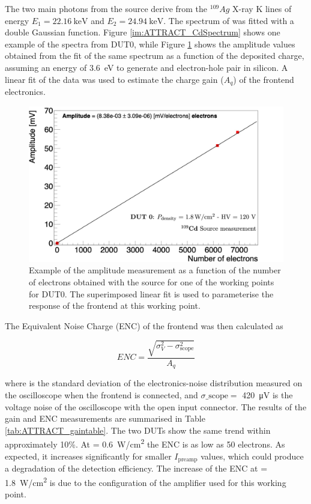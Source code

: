 		The two main photons from the \Cd source derive from the $ ^{109}Ag $ X-ray K lines of energy $E_{1} = \SI{22.16}{\kilo\electronvolt}$ and $E_{2} = \SI{24.94}{\kilo\electronvolt} $.
		The spectrum of \Cd was fitted with a double Gaussian function. Figure \ref{im:ATTRACT_CdSpectrum} shows one example of the spectra from DUT0, while Figure \ref{im:ATTRACT_CdFit} shows the amplitude values obtained from the fit of the same spectrum as a function of the deposited charge, assuming an energy of \SI{3.6}{\electronvolt} to generate and electron-hole pair in silicon. A linear fit of the data was used to estimate the charge gain ($ A_q $) of the frontend electronics. 
		
		
		\begin{figure}[h]
			\centering
			\includegraphics[width=0.8\linewidth]{files/ATTRACT_paper/Calibration_DUT0_120V_150uA}
			\caption{Example of the amplitude measurement as a function of the number of electrons obtained with the \Cd source for one of the working points for DUT0. The superimposed linear fit  is used to parameterise  the response of the frontend at this working point.}
			\label{im:ATTRACT_CdFit}
		\end{figure}

		The Equivalent Noise Charge (ENC) of the frontend was then calculated as

		\vspace{-3mm}
		\begin{equation*}
			ENC = \frac{\sqrt{\sigma_V^2-\sigma_{\text{scope}}^2}}{A_q}
		\end{equation*}

		\vspace{-1mm}
		where \noise is the standard deviation of the electronics-noise distribution measured on the oscilloscope when the frontend is connected, and $\sigma\_{\text{scope}} =$ \SI{420}{\micro\volt} is the voltage noise of the oscilloscope with the open input connector. The results of the gain and ENC measurements are summarised in Table \ref{tab:ATTRACT_gaintable}. The two DUTs show the same trend within approximately 10\%. At  \power = \SI{0.6}{\watt/\centi\meter^2} the ENC is as low as 50 electrons. As expected, it increases significantly for smaller $ I_{\text{preamp}} $ values, which could produce a degradation of the detection efficiency. The increase of the ENC at \power =  \SI{1.8}{\watt/\centi\meter^2} is due to the configuration of the amplifier used for this working point.

